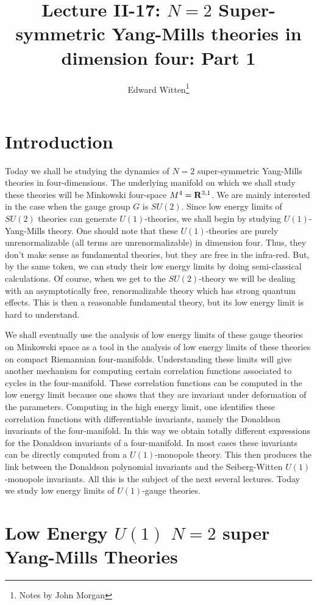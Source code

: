 \documentclass[10pt]{article}
\title{Lecture II-17: $N=2$ Super-symmetric Yang-Mills theories in
dimension four: Part 1}
\author{Edward Witten\thanks{Notes by John Morgan}}
\date{}
\begin{document}
\maketitle


\section{Introduction}

Today we shall be studying the dynamics of  $N=2$ super-symmetric
Yang-Mills theories in 
four-dimensions. The underlying manifold on which we shall study these
theories will be Minkowski four-space $M^4={\bf R}^{3,1}$. We are
mainly interested in the case when the gauge group $G$ is
$SU(2)$. Since low energy limits of $SU(2)$ theories can
generate $U(1)$-theories, we shall begin by
studying $U(1)$-Yang-Mills theory. One should note that these
$U(1)$-theories are purely unrenormalizable (all terms are
unrenormalizable) in dimension four. Thus, they  don't make sense
as fundamental theories, but they are free in the infra-red.
But, by the same token, we can study their low
energy  limits by doing semi-classical calculations.
Of course, when we get to the $SU(2)$-theory we will be dealing with
an asymptotically free, renormalizable theory which has strong quantum
effects. This is then a reasonable fundamental theory, but its low
energy limit is hard to understand. 

We shall eventually use the analysis of low energy limits of these
gauge theories on Minkowski space as a tool in the analysis of low
energy limits of these
theories on compact Riemannian four-manifolds. Understanding these
limits will give another mechanism for computing certain correlation
functions associated to cycles in the four-manifold.  These
correlation functions can be computed in the low energy limit because
one shows that they are invariant under deformation of the parameters.
Computing in  the high energy limit, one identifies these correlation
functions with differentiable invariants, namely the Donaldson invariants
of the four-manifold. In this way we obtain totally different
expressions for the Donaldson invariants of a four-manifold.  In 
most cases these invariants can be directly computed from a
$U(1)$-monopole theory. This then produces the link between the
Donaldson polynomial invariants and the Seiberg-Witten $U(1)$-monopole
invariants. All this is the subject of the next several lectures.
Today we study low energy limits of $U(1)$-gauge theories.


\section{Low Energy $U(1)$ $N=2$ super Yang-Mills Theories}
\end{document}
